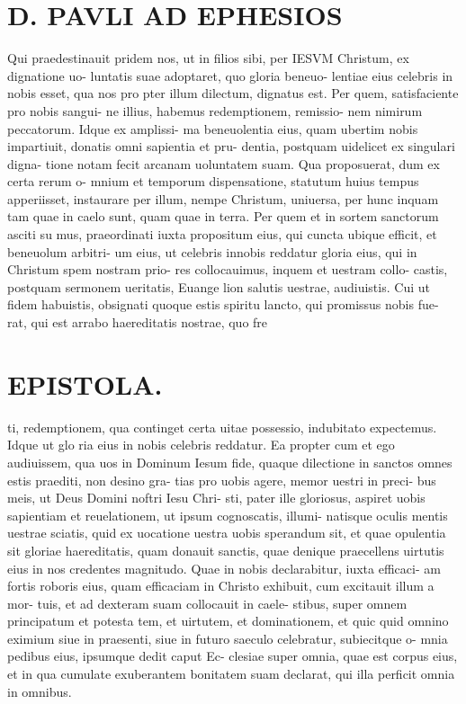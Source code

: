 \documentclass{article}
\begin{document}
\begin{pages}
\section*{D. PAVLI AD EPHESIOS }
\marginpar{[ p.3.  ]}
\marginpar{[ p.4.  ]}
\marginpar{[ p.5.  ]}
\marginpar{[ p.6.  ]}
\marginpar{[ p.7.  ]}\pstart Qui praedestinauit pridem nos, ut in filios sibi, per IESVM Christum, ex dignatione uo- luntatis suae adoptaret, quo gloria beneuo- lentiae eius celebris in nobis esset, qua nos pro pter illum dilectum, dignatus est.  \pend\pstart Per  quem, satisfaciente pro nobis sangui- ne illius, habemus redemptionem, remissio- nem nimirum peccatorum.  Idque  ex amplissi- ma beneuolentia eius, quam ubertim nobis impartiuit, donatis omni sapientia et pru- dentia, postquam uidelicet ex singulari digna- tione notam fecit arcanam uoluntatem suam.  \pend\pstart Qua proposuerat, dum ex certa rerum o- mnium et temporum dispensatione, statutum huius tempus apperiisset, instaurare per illum, nempe Christum, uniuersa, per hunc inquam tam quae in caelo sunt, quam quae in terra.  \pend\pstart Per quem et in sortem sanctorum asciti su mus, praeordinati iuxta propositum eius, qui cuncta ubique efficit, et beneuolum arbitri- um eius, ut celebris innobis reddatur gloria eius, qui in Christum spem nostram prio- res collocauimus, inquem et uestram collo- castis, postquam sermonem ueritatis, Euange lion salutis uestrae, audiuistis.  \pend\pstart Cui ut fidem habuistis, obsignati quoque estis spiritu lancto, qui promissus nobis fue- rat, qui est arrabo haereditatis nostrae, quo fre  \pend
\section*{EPISTOLA. }
\marginpar{[ p.10 ]}
\marginpar{[ p.8. ]}
\marginpar{[ p.9. ]}\pstart ti, redemptionem, qua continget certa uitae possessio, indubitato expectemus. Idque ut glo ria eius in nobis celebris reddatur.  \pend\pstart Ea propter cum et ego audiuissem, qua uos in Dominum Iesum fide, quaque  dilectione in sanctos omnes estis praediti, non desino gra- tias pro uobis agere, memor uestri in preci- bus meis, ut Deus Domini noftri Iesu Chri- sti, pater ille gloriosus, aspiret uobis sapientiam et reuelationem, ut ipsum cognoscatis, illumi- natisque  oculis mentis uestrae sciatis, quid ex uocatione uestra uobis sperandum sit, et quae opulentia sit gloriae haereditatis, quam donauit sanctis, quae denique praecellens uirtutis eius in nos credentes magnitudo.  \pend\pstart Quae in nobis declarabitur, iuxta efficaci- am fortis roboris eius, quam efficaciam in Christo exhibuit, cum excitauit illum a mor- tuis, et ad dexteram suam collocauit in caele- stibus, super omnem principatum et potesta tem, et uirtutem, et dominationem, et quic quid omnino eximium siue in praesenti, siue in futuro saeculo celebratur, subiecitque  o- mnia pedibus eius, ipsumque  dedit caput Ec- clesiae super omnia, quae est corpus eius, et in qua cumulate exuberantem bonitatem suam declarat, qui illa perficit omnia in omnibus.  \pend

\end{pages}
\end{document}
